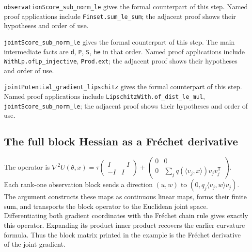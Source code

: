 \documentclass[11pt,a4paper]{report}
\begin{document}
\begin{leanbox}
\texttt{observation\allowbreak{}Score\_\allowbreak{}sub\_\allowbreak{}norm\_\allowbreak{}le} gives the formal counterpart of this step. Named proof applications include \texttt{Finset.\allowbreak{}sum\_\allowbreak{}le\_\allowbreak{}sum}; the adjacent proof shows their hypotheses and order of use.




\texttt{joint\allowbreak{}Score\_\allowbreak{}sub\_\allowbreak{}norm\_\allowbreak{}le} gives the formal counterpart of this step. The main intermediate facts are \texttt{d}, \texttt{P}, \texttt{S}, \texttt{he} in that order. Named proof applications include \texttt{With\allowbreak{}Lp.\allowbreak{}of\allowbreak{}Lp\_\allowbreak{}injective}, \texttt{Prod.\allowbreak{}ext}; the adjacent proof shows their hypotheses and order of use.




\texttt{joint\allowbreak{}Potential\_\allowbreak{}gradient\_\allowbreak{}lipschitz} gives the formal counterpart of this step. Named proof applications include \texttt{Lipschitz\allowbreak{}With.\allowbreak{}of\_\allowbreak{}dist\_\allowbreak{}le\_\allowbreak{}mul}, \texttt{joint\allowbreak{}Score\_\allowbreak{}sub\_\allowbreak{}norm\_\allowbreak{}le}; the adjacent proof shows their hypotheses and order of use.
\end{leanbox}
\subsection{\texorpdfstring{The full block Hessian as a Fréchet derivative}{The full block Hessian as a Fréchet derivative}}
\label{report-step-KIPLMC-LogisticExample-lean-7}


The operator is \(\nabla^2U(\theta,x)=\tau\begin{pmatrix}I&-I\\-I&I\end{pmatrix}+\begin{pmatrix}0&0\\0&\sum_jq(\langle v_j,x\rangle)v_jv_j^{\mathsf T}\end{pmatrix}\). Each rank-one observation block sends a direction \((u,w)\) to \((0,q_j\langle v_j,w\rangle v_j)\). The argument constructs these maps as continuous linear maps, forms their finite sum, and transports the block operator to the Euclidean joint space. Differentiating both gradient coordinates with the Fréchet chain rule gives exactly this operator. Expanding its product inner product recovers the earlier curvature formula. Thus the block matrix printed in the example is the Fréchet derivative of the joint gradient.
\end{document}
